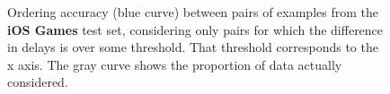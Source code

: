 \documentclass[10pt,a4paper,notitlepage,twocolumn]{article}
\begin{document}
\begin{figure}[p]
\caption{Ordering accuracy (blue curve) between pairs of examples from the {\bf
iOS Games} test set, considering only pairs for which the difference
in delays is over some threshold. That threshold corresponds to the
x axis. The gray curve shows the proportion of data actually
considered.}
\label{fig:oa_ios}
\end{figure}
\end{document}

